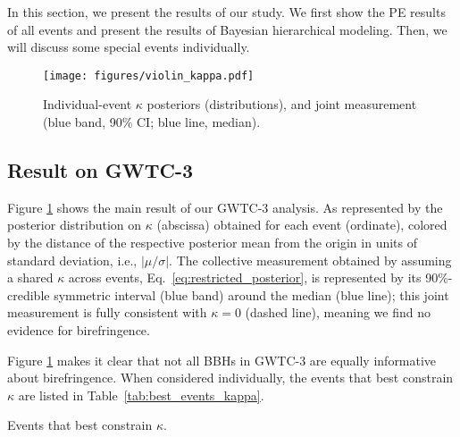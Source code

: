 \documentclass[aps,prd,twocolumn,superscriptaddress,preprintnumbers,floatfix,nofootinbib]{revtex4-2}
\begin{document}
In this section, we present the results of our study.
We first show the \ac{PE} results of all events and present the results of Bayesian hierarchical modeling.
Then, we will discuss some special events individually.

\begin{figure}
    \texttt{[image: figures/violin\_kappa.pdf]}
    \caption{
        Individual-event $\kappa$ posteriors (distributions), and joint measurement (blue band, 90\% CI; blue line, median).
    }
    \label{fig:violin_kappa}
\end{figure}

\subsection{Result on GWTC-3}

Figure \ref{fig:violin_kappa} shows the main result of our GWTC-3 analysis.
As represented by the posterior distribution on $\kappa$ (abscissa) obtained for each event (ordinate), colored by the distance of the respective posterior mean from the origin in units of standard deviation, i.e., $|\mu/\sigma|$.
The collective measurement obtained by assuming a shared $\kappa$ across events, Eq.~\eqref{eq:restricted_posterior}, is represented by its 90\%-credible symmetric interval (blue band) around the median (blue line);
this joint measurement is fully consistent with $\kappa = 0$ (dashed line), meaning we find no evidence for birefringence.

Figure \ref{fig:violin_kappa} makes it clear that not all \acp{BBH} in GWTC-3 are equally informative about birefringence.
When considered individually, the events that best constrain $\kappa$ are listed in Table~\ref{tab:best_events_kappa}.

\begin{table}
    \caption{Events that best constrain $\kappa$.}
    \begin{ruledtabular}
    \end{ruledtabular}
    \label{tab:best_events_kappa}
\end{table}
\end{document}
